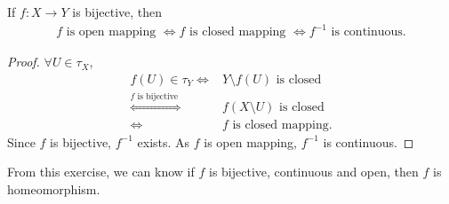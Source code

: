 \begin{exercise}
    If $f:X\rightarrow Y$ is bijective, then
    \begin{align*}
        f \text{ is open mapping }\Leftrightarrow f\text{ is closed mapping }\Leftrightarrow f^{-1} \text{ is continuous}.
    \end{align*}
\end{exercise}

\begin{proof}
    $\forall U\in\tau_X$,
    \begin{align*}
        f(U)\in \tau_Y \Leftrightarrow & Y\setminus f(U) \text{ is closed }\\
                                \overset{f \text{ is bijective }}{\Leftrightarrow} & f(X\setminus U) \text{ is closed } \\
                                \Leftrightarrow & f \text{ is closed mapping}.
    \end{align*}
    Since $f$ is bijective, $f^{-1}$ exists. As $f$ is open mapping, $f^{-1}$ is continuous.
\end{proof}

\begin{remark}
    From this exercise, we can know if $f$ is bijective, continuous and open, then $f$ is homeomorphism.
\end{remark}
